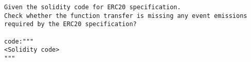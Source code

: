 \begin{lstlisting}[label={lst:exp-inst-st4},captionpos=b, caption={Example of prompt in instruction experiment setting-4},language=GPTPrompt]
Given the solidity code for ERC20 specification.
Check whether the function transfer is missing any event emissions required by the ERC20 specification?

code:"""
<Solidity code>
"""
\end{lstlisting}